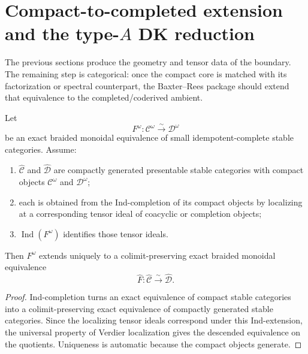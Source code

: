 \section{Compact-to-completed extension and the type-$A$ DK reduction}
\label{sec:typeA-DK-reduction}

The previous sections produce the geometry and tensor data of the
boundary.  The remaining step is categorical: once the compact core is
matched with its factorization or spectral counterpart, the Baxter--Rees
package should extend that equivalence to the completed/coderived ambient.

\begin{theorem}
\ClaimStatusProvedHere
\label{thm:compact-to-completed-extension-principle}
Let
\begin{equation}
F^\omega:\mathcal C^\omega\xrightarrow{\sim}\mathcal D^\omega
\end{equation}
be an exact braided monoidal equivalence of small idempotent-complete
stable categories.  Assume:
\begin{enumerate}
    \item $\widehat{\mathcal C}$ and $\widehat{\mathcal D}$ are compactly
    generated presentable stable categories with compact objects
    $\mathcal C^\omega$ and $\mathcal D^\omega$;
    \item each is obtained from the Ind-completion of its compact objects
    by localizing at a corresponding tensor ideal of coacyclic or
    completion objects;
    \item $\operatorname{Ind}(F^\omega)$ identifies those tensor ideals.
\end{enumerate}
Then $F^\omega$ extends uniquely to a colimit-preserving exact braided
monoidal equivalence
\begin{equation}
\widehat F:\widehat{\mathcal C}\xrightarrow{\sim}\widehat{\mathcal D}.
\end{equation}
\end{theorem}

\begin{proof}
Ind-completion turns an exact equivalence of compact stable categories
into a colimit-preserving exact equivalence of compactly generated stable
categories.  Since the localizing tensor ideals correspond under this
Ind-extension, the universal property of Verdier localization gives the
descended equivalence on the quotients.  Uniqueness is automatic because
the compact objects generate.
\end{proof}

